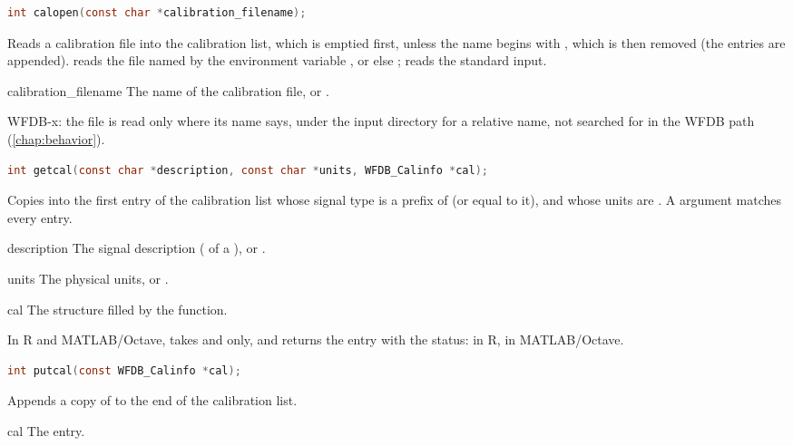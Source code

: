 \begin{lstlisting}[language=C,style=signature]
int calopen(const char *calibration_filename);
\end{lstlisting}
Reads a calibration file into the calibration list, which is emptied first,
unless the name begins with \code{+}, which is then removed (the entries are
appended).  reads the file named by the environment variable
, or else ; \code{-} reads the standard input.
\begin{params}
\item[calibration\_filename] The name of the calibration file, or
  .
\end{params}

WFDB-x: the file is read only where its name says, under the input directory
for a relative name, not searched for in the WFDB path (\cref{chap:behavior}).

\begin{lstlisting}[language=C,style=signature]
int getcal(const char *description, const char *units, WFDB_Calinfo *cal);
\end{lstlisting}
Copies into  the first entry of the calibration list whose signal
type is a prefix of  (or equal to it), and whose units are
. A  argument matches every entry.
\begin{params}
\item[description] The signal description ( of a
  ), or .
\item[units] The physical units, or .
\item[cal] The structure filled by the function.
\end{params}

In R and MATLAB/Octave,  takes  and
 only, and returns the entry with the status:  in R,  in MATLAB/Octave.

\begin{lstlisting}[language=C,style=signature]
int putcal(const WFDB_Calinfo *cal);
\end{lstlisting}
Appends a copy of  to the end of the calibration list.
\begin{params}
\item[cal] The entry.
\end{params}

